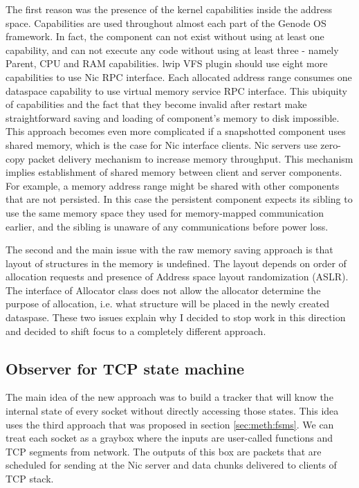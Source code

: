 The first reason was the presence of the kernel capabilities inside the address
space. Capabilities are used throughout almost each part of the Genode OS
framework. In fact, the component can not exist without using at least one
capability, and can not execute any code without using at least three - namely
Parent, CPU and RAM capabilities. lwip VFS plugin should use eight more
capabilities to use Nic RPC interface. Each allocated address range consumes
one dataspace capability to use virtual memory service RPC interface. This
ubiquity of capabilities and the fact that they become invalid after restart
make straightforward saving and loading of component's memory to disk
impossible. This approach becomes even more complicated if a snapshotted
component uses shared memory, which is the case for Nic interface clients. Nic
servers use zero-copy packet delivery mechanism to increase memory throughput.
This mechanism implies establishment of shared memory between client and server
components. For example, a memory address range might be shared with other
components that are not persisted. In this case the persistent component
expects its sibling to use the same memory space they used for memory-mapped
communication earlier, and the sibling is unaware of any communications before
power loss.

The second and the main issue with the raw memory saving approach is that
layout of structures in the memory is undefined. The layout depends on order
of allocation requests and presence of Address space layout randomization
(ASLR). The interface of Allocator class does not allow the allocator determine
the purpose of allocation, i.e. what structure will be placed in the newly
created dataspase. These two issues explain why I decided to stop work in this
direction and decided to shift focus to a completely different approach.

\subsection{Observer for TCP state machine}

The main idea of the new approach was to build a tracker that will know the
internal state of every socket without directly accessing those states. This
idea uses the third approach that was proposed in section \ref{sec:meth:fsms}. 
We can treat each socket as a graybox where the inputs are user-called
functions and TCP segments from network. The outputs of this box are packets
that are scheduled for sending at the Nic server and data chunks delivered to
clients of TCP stack.

